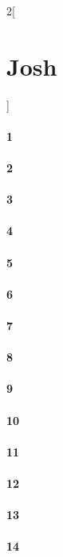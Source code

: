 \documentclass{book}
\begin{document}
\begin{multicols}{2}[\part{Josh}]
\subsection*{1}
\subsection*{2}
\subsection*{3}
\subsection*{4}
\subsection*{5}
\subsection*{6}
\subsection*{7}
\subsection*{8}
\subsection*{9}
\subsection*{10}
\subsection*{11}
\subsection*{12}
\subsection*{13}
\subsection*{14}

\end{multicols}
\end{document}
